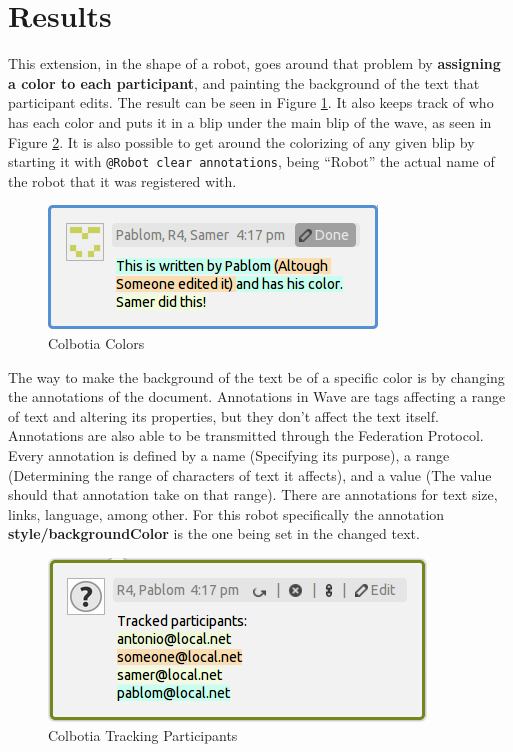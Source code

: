 \section{Results}
This extension, in the shape of a robot, goes around that problem by \textbf{assigning a color to each participant}, and painting the background of the text that participant edits. The result can be seen in Figure \ref{fig:colorizer_editions}. It also keeps track of who has each color and puts it in a blip under the main blip of the wave, as seen in Figure \ref{fig:colorizer_editors}. It is also possible to get around the colorizing of any given blip by starting it with \verb|@Robot clear annotations|, being ``Robot'' the actual name of the robot that it was registered with.
\begin{figure}[H]
  \center
    \includegraphics[keepaspectratio, scale=0.8]{Media/Captures/Extensions/Colorizer/ColorizerEditions.png}
  \caption{Colbotia Colors}
  \label{fig:colorizer_editions}
\end{figure}
The way to make the background of the text be of a specific color is by changing the annotations of the document. Annotations in Wave are tags affecting a range of text and altering its properties, but they don't affect the text itself. Annotations are also able to be transmitted through the Federation Protocol. Every annotation is defined by a name (Specifying its purpose), a range (Determining the range of characters of text it affects), and a value (The value should that annotation take on that range). There are annotations for text size, links, language, among other. For this robot specifically the annotation \textbf{style/backgroundColor} is the one being set in the changed text.\\[.2cm]
\begin{figure}[H]
  \center
    \includegraphics[keepaspectratio, scale=0.7]{Media/Captures/Extensions/Colorizer/ColorizerEditors.png}
  \caption{Colbotia Tracking Participants}
  \label{fig:colorizer_editors}
\end{figure}
